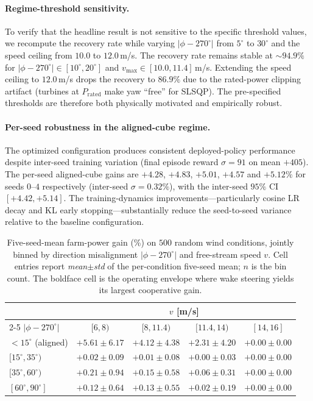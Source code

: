\documentclass[final,5p,times]{elsarticle}
\begin{document}
\paragraph{Regime-threshold sensitivity.}
To verify that the headline result is not sensitive to the specific threshold values, we recompute the recovery rate while varying $|\phi\!-\!270^\circ|$ from $5^\circ$ to $30^\circ$ and the speed ceiling from $10.0$ to $12.0$\,m/s. The recovery rate remains stable at ${\sim}94.9\%$ for $|\phi\!-\!270^\circ|\!\in\![10^\circ,20^\circ]$ and $v_\mathrm{max}\!\in\![10.0,11.4]$\,m/s. Extending the speed ceiling to $12.0$\,m/s drops the recovery to $86.9\%$ due to the rated-power clipping artifact (turbines at $P_\mathrm{rated}$ make yaw ``free'' for SLSQP). The pre-specified thresholds are therefore both physically motivated and empirically robust.

\paragraph{Per-seed robustness in the aligned-cube regime.}
The optimized configuration produces consistent deployed-policy performance despite inter-seed training variation (final episode reward $\sigma\!=\!91$ on mean $+405$). The per-seed aligned-cube gains are $+4.28$, $+4.83$, $+5.01$, $+4.57$ and $+5.12\%$ for seeds $0$--$4$ respectively (inter-seed $\sigma\!=\!0.32\%$), with the inter-seed $95\%$ CI $[+4.42,+5.14]$. The training-dynamics improvements---particularly cosine LR decay and KL early stopping---substantially reduce the seed-to-seed variance relative to the baseline configuration.

\begin{table}[t]
\centering
\caption{Five-seed-mean farm-power gain (\%) on $500$ random wind conditions, jointly binned by direction misalignment $|\phi-270^\circ|$ and free-stream speed $v$. Cell entries report \emph{mean$\pm$std} of the per-condition five-seed mean; $n$ is the bin count. The boldface cell is the operating envelope where wake steering yields its largest cooperative gain.}
\label{tab:dist_eval_binned}
\small
\begin{tabular}{lcccc}
\toprule
 & \multicolumn{4}{c}{$v$ [m/s]} \\
\cmidrule(lr){2-5}
$|\phi\!-\!270^\circ|$ & $[6,8)$ & $[8,11.4)$ & $[11.4,14)$ & $[14,16]$ \\
\midrule
$<\!15^\circ$ (aligned)     & $\mathbf{+5.61\!\pm\!6.17}$ & $+4.12\!\pm\!4.38$ & $+2.31\!\pm\!4.20$ & $+0.00\!\pm\!0.00$ \\
$[15^\circ,35^\circ)$       & $+0.02\!\pm\!0.09$ & $+0.01\!\pm\!0.08$ & $+0.00\!\pm\!0.03$ & $+0.00\!\pm\!0.00$ \\
$[35^\circ,60^\circ)$       & $+0.21\!\pm\!0.94$ & $+0.15\!\pm\!0.58$ & $+0.06\!\pm\!0.31$ & $+0.00\!\pm\!0.00$ \\
$[60^\circ,90^\circ]$       & $+0.12\!\pm\!0.64$ & $+0.13\!\pm\!0.55$ & $+0.02\!\pm\!0.19$ & $+0.00\!\pm\!0.00$ \\
\bottomrule
\end{tabular}
\end{table}
\end{document}
